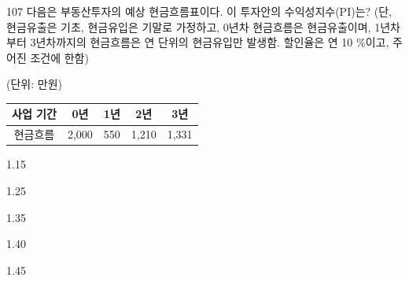 \begin{question}{107}
다음은 부동산투자의 예상 현금흐름표이다. 이 투자안의 수익성지수(PI)는? (단, 현금유출은 기초, 현금유입은 기말로 가정하고, 0년차 현금흐름은 현금유출이며, 1년차부터 3년차까지의 현금흐름은 연 단위의 현금유입만 발생함. 할인율은 연 10 \%이고, 주어진 조건에 한함)
\begin{flushright}(단위: 만원)\end{flushright}
{\small\centering
\begin{tabular}{|c|c|c|c|c|}\hline
사업 기간 & 0년 & 1년 & 2년 & 3년 \\ \hline
현금흐름 & 2,000 & 550 & 1,210 & 1,331 \\ \hline
\end{tabular}\par}
\begin{choices}
  \item 1.15
  \item 1.25
  \item 1.35
  \item 1.40
  \item 1.45
\end{choices}
\end{question}
